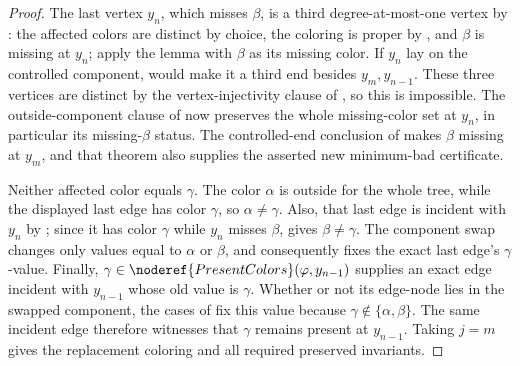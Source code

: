 \begin{proof}
The last vertex \(y_n\), which misses \(\beta\), is a third
degree-at-most-one vertex by :
the affected colors are distinct by choice, the coloring is proper by
, and \(\beta\) is missing at \(y_n\); apply the lemma
with \(\beta\) as its missing color.  If \(y_n\) lay on the controlled
component,  would make it a third
end besides \(y_m,y_{n-1}\).  These three vertices are distinct by the
vertex-injectivity clause of , so this is
impossible.  The outside-component clause of
 now preserves the whole
missing-color set at \(y_n\), in particular its missing-\(\beta\)
status.  The controlled-end conclusion of
 makes \(\beta\) missing at
\(y_m\), and that theorem also supplies the asserted new minimum-bad
certificate.

Neither affected color equals \(\gamma\).  The color \(\alpha\) is
outside  for the whole tree, while the displayed
last edge has color \(\gamma\), so \(\alpha\ne\gamma\).  Also, that last
edge is incident with \(y_n\) by ; since it has
color \(\gamma\) while \(y_n\) misses \(\beta\),
 gives \(\beta\ne\gamma\).  The component swap
 changes only values equal to
\(\alpha\) or \(\beta\), and consequently fixes the exact last edge's
\(\gamma\)-value.  Finally,
\(\gamma\in\noderef{PresentColors}(\varphi,y_{n-1})\) supplies an exact
edge incident with \(y_{n-1}\) whose old value is \(\gamma\).  Whether
or not its edge-node lies in the swapped component, the cases of
 fix this value because
\(\gamma\notin\{\alpha,\beta\}\).  The same incident edge therefore
witnesses that \(\gamma\) remains present at \(y_{n-1}\).  Taking
\(j=m\) gives the replacement coloring and all required preserved
invariants.
\end{proof}
